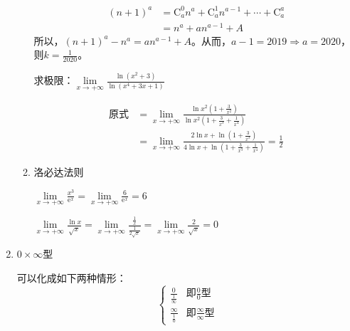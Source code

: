 \begin{enumerate}
\begin{enumerate}
        \begin{solution}
            \begin{align*}
                (n+1)^a &=\mathrm{C}_a^0 n^a+\mathrm{C}_a^1 n^{a-1}+\cdots+\mathrm{C}_a^a\\
                &=n^a+an^{a-1}+A
            \end{align*}
            所以，$(n+1)^a-n^a=an^{a-1}+A$。从而，$a-1=2019 \Rightarrow a=2020$，则$k=\displaystyle\frac{1}{2020}$。
        \end{solution}

        \begin{example}
            求极限：$\lim\limits_{x \to +\infty}\displaystyle\frac{\ln (x^2+3)}{\ln(x^4+3x+1)}$
        \end{example}

        \begin{solution}
            \begin{align*}
                \text{原式}
                &=\lim_{x \to +\infty}\frac{\ln{x^2(1+\frac{3}{x^2})}}{\ln{x^2(1+\frac{3}{x^3}+\frac{1}{x^4})}}\\
                &=\lim_{x \to +\infty}\frac{2\ln x+\ln(1+\frac{3}{x^3})}{4\ln x+\ln(1+\frac{3}{x^3}+\frac{1}{x^4})}=\frac{1}{2}
            \end{align*}
        \end{solution}

        \item 洛必达法则
        \begin{example}
            $\lim\limits_{x \to +\infty}\displaystyle\frac{x^3}{\mathrm{e}^x}=\lim\limits_{x \to +\infty}\displaystyle\frac{6}{\mathrm{e}^x}=6$
        \end{example}

        \begin{example}
            $\lim\limits_{x \to +\infty}\displaystyle\frac{\ln x}{\sqrt{x}}=\lim\limits_{x \to +\infty}\displaystyle\frac{\frac{1}{x}}{\frac{1}{2\sqrt{x}}}=\lim\limits_{x \to +\infty}\displaystyle\frac{2}{\sqrt{x}}=0$
        \end{example}
        \end{enumerate}

        \item $0 \times \infty$型

        可以化成如下两种情形：
        \[ \left\{
                        \begin{array}{rl}
                             \frac{0}{\frac{1}{\infty}} &\text{即} \frac{0}{0}\text{型}\\
                             \frac{\infty}{\frac{1}{0}} &\text{即} \frac{\infty}{\infty}\text{型}
                        \end{array} \right. \]


\end{enumerate}
